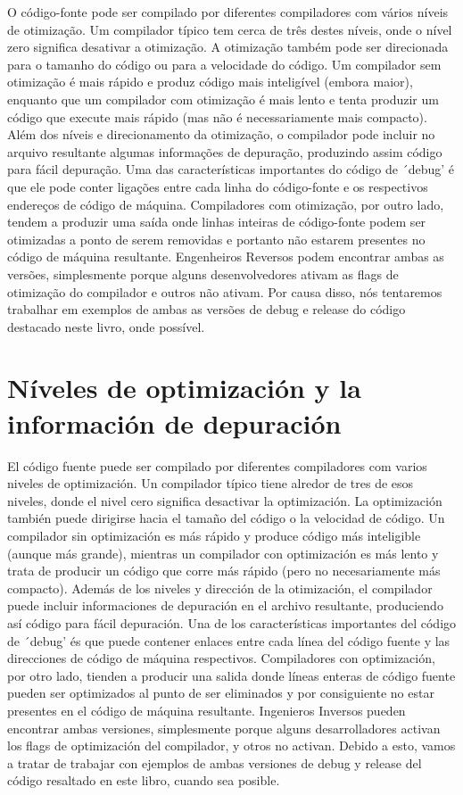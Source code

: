 O código-fonte pode ser compilado por diferentes compiladores com vários níveis de otimização.
Um compilador típico tem cerca de três destes níveis, onde o nível zero significa desativar a otimização.
A otimização também pode ser direcionada para o tamanho do código ou para a velocidade do código.
Um compilador sem otimização é mais rápido e produz código mais inteligível (embora maior),
enquanto que um compilador com otimização é mais lento e tenta produzir um código que execute mais rápido (mas não é necessariamente mais compacto).
Além dos níveis e direcionamento da otimização, o compilador pode incluir no arquivo resultante algumas informações de depuração, produzindo assim código para fácil depuração.
Uma das características importantes do código de ´debug' é que ele pode conter 
ligações entre cada linha do código-fonte e os respectivos endereços de código de máquina.
Compiladores com otimização, por outro lado, tendem a produzir uma saída onde linhas inteiras de código-fonte podem ser otimizadas a ponto de serem removidas e portanto não estarem presentes no código de máquina resultante.
Engenheiros Reversos podem encontrar ambas as versões, simplesmente porque alguns desenvolvedores ativam as flags de otimização do compilador e outros não ativam. 
Por causa disso, nós tentaremos trabalhar em exemplos de ambas as versões de debug e release do código destacado neste livro, onde possível.
\fi
\fi %

\ifdefined\SPANISH
\section*{Níveles de optimización y la información de depuración}
El código fuente puede ser compilado por diferentes compiladores com varios niveles de optimización.
Un compilador típico tiene alredor de tres de esos niveles, donde el nivel cero significa desactivar la optimización.
La optimización también puede dirigirse hacia el tamaño del código o la velocidad de código.
Un compilador sin optimización es más rápido y produce código más inteligible (aunque más grande), 
mientras un compilador con optimización es más lento y trata de producir un código que corre más rápido (pero no necesariamente más compacto).
Además de los niveles y dirección de la otimización, el compilador puede incluir informaciones de depuración en el archivo resultante, produciendo así código para fácil depuración.
Una de los características importantes del código de ´debug' és que puede contener enlaces entre
cada línea del código fuente y las direcciones de código de máquina respectivos.
Compiladores con optimización, por otro lado, tienden a producir una salida donde líneas enteras de código fuente pueden ser optimizados al punto de ser eliminados y por consiguiente no estar presentes en el código de máquina resultante.
Ingenieros Inversos pueden encontrar ambas versiones, simplesmente porque alguns desarrolladores activan los flags de optimización del compilador, y otros no activan. 
Debido a esto, vamos a tratar de trabajar con ejemplos de ambas versiones de debug y release del código resaltado en este libro, cuando sea posible.
\fi %

